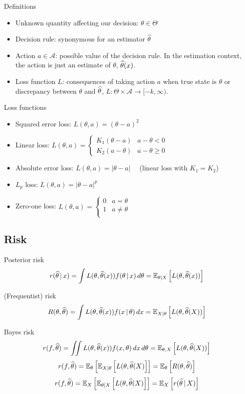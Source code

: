 \documentclass[landscape]{article}
\begin{document}
\begin{multicols*}{2}
Definitions
\begin{itemize}
  \item Unknown quantity affecting our decision: $\theta \in \Theta$
  \item Decision rule: synonymous for an estimator $\that$
  \item Action $a \in \mathcal{A}$: possible value of the decision rule. In the
    estimation context, the action is just an estimate of $\theta$, $\that(x)$.
  \item Loss function $L$: consequences of taking action $a$ when true state is
    $\theta$ or discrepancy between $\theta$ and $\that$,
    $L: \Theta \times \mathcal{A} \to [-k,\infty).$
\end{itemize}

Loss functions
\begin{itemize}
  \item Squared error loss: $L(\theta,a) = (\theta-a)^2$
  \item Linear loss: $L(\theta,a) = \begin{cases}
      K_1(\theta-a) & a-\theta < 0 \\
      K_2(a-\theta) & a-\theta \ge 0
    \end{cases}$
  \item Absolute error loss: $L(\theta,a) = |\theta-a| \quad$
    (linear loss with $K_1=K_2$)
  \item $L_p$ loss: $L(\theta,a) = |\theta-a|^p$
  \item Zero-one loss: $L(\theta,a) = \begin{cases}
      0 & a=\theta \\
      1 & a\neq\theta \\
    \end{cases}$
\end{itemize}

\subsection{Risk}

Posterior risk
\[r(\that \giv x)
= \int L(\theta,\that(x))f(\theta\giv x)\,d\theta
= \E[\theta|X]{L(\theta,\that(x))}\]

(Frequentist) risk
\[R(\theta,\that)
= \int L(\theta,\that(x)) f(x\giv\theta) \dx
= \E[X|\theta]{L(\theta,\that(X))}\]

Bayes risk
\[r(f,\that)
= \iint L(\theta,\that(x))f(x,\theta)\dx\dtheta
= \E[\theta,X]{L(\theta,\that(X))}\]
\[r(f,\that)
= \E[\theta]{\E[X|\theta]{L(\theta,\that(X)}}
= \E[\theta]{R(\theta,\that)}\]
\[r(f,\that)
= \E[X]{\E[\theta|X]{L(\theta,\that(X)}}
= \E[X]{r(\that\giv X)}\]


\end{multicols*}
\end{document}

